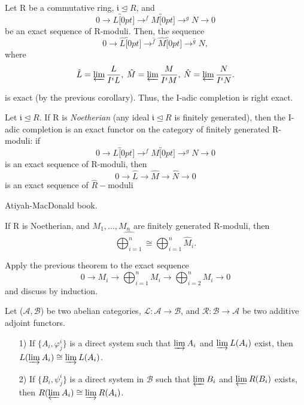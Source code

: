 \documentclass[../category_theory.tex]{subfiles}
\begin{document}
\begin{example}
	Let R be a commutative ring, \(\mathfrak{i} \trianglelefteq R\), and
	\[
		0\rightarrow L\overbracket[0pt]{\rightarrow}^{f}M\overbracket[0pt]{\rightarrow}^{g}N\rightarrow 0
	\]
	be an exact sequence of R-moduli. Then, the sequence
	\[
		0 \rightarrow \hat{L}\overbracket[0pt]{\rightarrow}^{\hat{f}}\hat{M}\overbracket[0pt]{\rightarrow}^{\hat{g}}\hat{N},
	\]
	where
	\[
		\hat{L}=\varprojlim_{}\frac{L}{I^{i}L}, \: \hat{M}=\varprojlim_{}\frac{M}{I^{i}M},\:\hat{N}=\varprojlim_{}\frac{N}{I^{i}N}.
	\]
	is exact (by the previous corollary). Thus, the I-adic completion is right exact.
	\begin{theorem*}
		Let \(\mathfrak{i} \trianglelefteq R.\) If R is \textit{Noetherian} (any ideal \(\mathfrak{i}\trianglelefteq R\) is finitely generated), then the I-adic completion is an exact functor on the category of finitely generated R-moduli: if
		\[
			0\rightarrow L\overbracket[0pt]{\rightarrow}^{f}M\overbracket[0pt]{\rightarrow}^{g}N\rightarrow 0
		\]
		is an exact sequence of R-moduli, then
		\[
			0\rightarrow \hat{L}\rightarrow \hat{M}\rightarrow \hat{N}\rightarrow 0
		\]
		is an exact sequence of \(\hat{R}-\)moduli
	\end{theorem*}
	\begin{proof*}
		Atiyah-MacDonald book.
	\end{proof*}
	\begin{crl*}
		If R is Noetherian, and \(M_{1},\dotsc , M_{n}\) are finitely generated R-moduli, then
		\[
			\widehat{\bigoplus_{i=1}^{n}}\cong \bigoplus_{i=1}^{n}\hat{M}_{i}.
		\]
	\end{crl*}
	\begin{proof*}
		Apply the previous theorem to the exact sequence
		\[
			0\rightarrow M_{i}\rightarrow \bigoplus_{i=1}^{n}M_{i}\rightarrow \bigoplus_{i=2}^{n}M_{i}\rightarrow 0
		\]
		and discuss by induction. \qedsymbol
	\end{proof*}
\end{example}
\begin{theorem*}
	Let (\(\mathcal{A}, \mathcal{B}\)) be two abelian categories, \(\mathcal{L}:\mathcal{A}\rightarrow \mathcal{B}\), and \(\mathcal{R}:\mathcal{B}\rightarrow \mathcal{A}\) be two additive adjoint functors.
	\begin{itemize}
		\item[1)] If \(\{A_{i}, \varphi _{j}^{i}\}\) is a direct system such that \(\varinjlim_{}A_{i}\) and \(\varinjlim_{}L(A_{i})\) exist, then \(L(\varinjlim_{}A_{i})\cong \varinjlim_{}L(A_{i})\).
		\item[2)] If \(\{B_{i}, \psi_{j}^{i}\}\) is a direct system in \(\mathcal{B}\) such that \(\varprojlim_{}B_{i}\) and \(\varprojlim_{}R(B_{i})\) exists, then \(R(\varprojlim_{}A_{i})\cong \varinjlim_{}R(A_{i})\).
	\end{itemize}
\end{theorem*}
\end{document}
